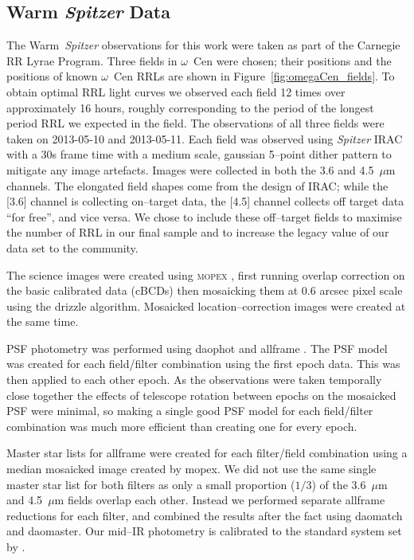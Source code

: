 \documentclass[a4paper,fleqn,usenatbib]{mnras}
\begin{document}
\subsection{Warm {\it Spitzer} Data}
\label{sec:spitzer_reduction}
The Warm~\textit{Spitzer} observations for this work were taken as part of the Carnegie RR Lyrae Program. Three fields in $\omega$~Cen were chosen; their positions and the positions of known $\omega$~Cen RRLs are shown in Figure~\ref{fig:omegaCen_fields}. To obtain optimal RRL light curves we observed each field 12 times over approximately 16 hours, roughly corresponding to the period of the longest period RRL we expected in the field. The observations of all three fields were taken on 2013-05-10 and 2013-05-11. Each field was observed using {\it Spitzer} IRAC \citep{2004ApJS..154...10F} with a 30s frame time with a medium scale, gaussian 5--point dither pattern to mitigate any image artefacts. Images were collected in both the 3.6 and 4.5~$\mu$m channels. 
The elongated field shapes come from the design of IRAC; while the [3.6] channel is collecting on--target data, the [4.5] channel collects off target data ``for free'', and vice versa. We chose to include these off--target fields to maximise the number of RRL in our final sample and to increase the legacy value of our data set to the community. 

The science images were created using \textsc{mopex} \citep{2006SPIE.6274E..0CM}, first running overlap correction on the basic calibrated data (cBCDs) then mosaicking them at 0.6 arcsec pixel scale using the drizzle algorithm. Mosaicked location--correction images were created at the same time. 

PSF photometry was performed using {\sc daophot} and {\sc allframe} \citep{1987PASP...99..191S, 1994PASP..106..250S}. The PSF model was created for each field/filter combination using the first epoch data. This was then applied to each other epoch. As the observations were taken temporally close together the effects of telescope rotation between epochs on the mosaicked PSF were minimal, so making a single good PSF model for each field/filter combination was much more efficient than creating one for every epoch. 

Master star lists for {\sc allframe} were created for each filter/field combination using a median mosaicked image created by {\sc mopex}. We did not use the same single master star list for both filters as only a small proportion ($1/3$) of the 3.6~$\mu$m and 4.5~$\mu$m fields overlap each other. Instead we performed separate {\sc allframe} reductions for each filter, and combined the results after the fact using {\sc daomatch} and {\sc daomaster}. Our mid--IR photometry is calibrated to the standard system set by \citet{2005PASP..117..978R}.
\end{document}
